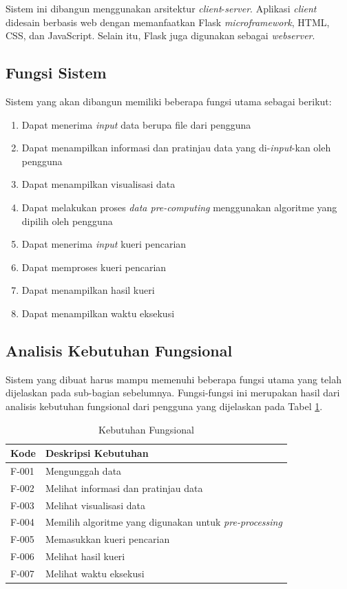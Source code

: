 Sistem ini dibangun menggunakan arsitektur \textit{client}-\textit{server}. Aplikasi \textit{client} didesain berbasis web dengan memanfaatkan Flask \textit{microframework}, HTML, CSS, dan JavaScript. Selain itu, Flask juga digunakan sebagai \textit{webserver}. 

\subsection{Fungsi Sistem}
\tab Sistem yang akan dibangun memiliki beberapa fungsi utama sebagai berikut:
\begin{enumerate}
	\item Dapat menerima \textit{input} data berupa file dari pengguna
	\item Dapat menampilkan informasi dan pratinjau data yang di-\textit{input}-kan oleh pengguna
	\item Dapat menampilkan visualisasi data
	\item Dapat melakukan proses \textit{data pre-computing} menggunakan algoritme yang dipilih oleh pengguna
	\item Dapat menerima \textit{input} kueri pencarian 
	\item Dapat memproses kueri pencarian
	\item Dapat menampilkan hasil kueri
	\item Dapat menampilkan waktu eksekusi
\end{enumerate}

\subsection{Analisis Kebutuhan Fungsional}
\tab Sistem yang dibuat harus mampu memenuhi beberapa fungsi utama yang telah dijelaskan pada sub-bagian sebelumnya. Fungsi-fungsi ini merupakan hasil dari analisis kebutuhan fungsional dari pengguna yang dijelaskan pada Tabel \ref{tab:kebutuhan-fungsional}.

\begin{table}[H]
	\small
	\centering
	\begin{tabular}{ | p{2cm} | p{6.5cm} | }
		\hline
		\textbf{Kode} & \textbf{Deskripsi Kebutuhan} \\ \hline \hline
		F-001 & Mengunggah data \\ \hline
		F-002 & Melihat informasi dan pratinjau data \\ \hline
		F-003 & Melihat visualisasi data  \\ \hline
		F-004 & Memilih algoritme yang digunakan untuk \textit{pre-processing}\\ \hline
		F-005 & Memasukkan kueri pencarian \\ \hline
		F-006 & Melihat hasil kueri \\ \hline
		F-007 & Melihat waktu eksekusi \\ \hline
	\end{tabular} \caption{Kebutuhan Fungsional}
	\label{tab:kebutuhan-fungsional}
\end{table}

